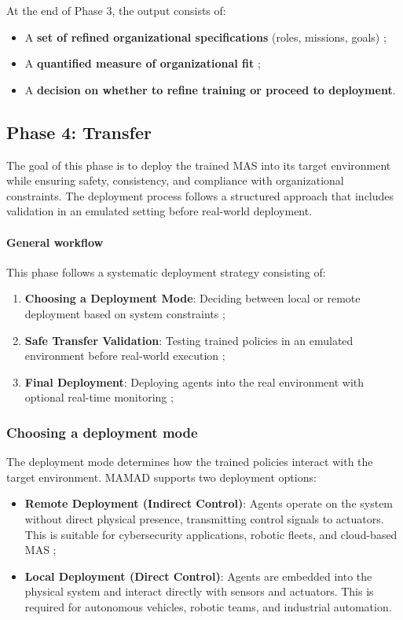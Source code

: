 \documentclass[pdflatex,sn-mathphys-num]{sn-jnl}%
\theoremstyle{thmstyleone}%
\theoremstyle{thmstyletwo}%
\theoremstyle{thmstylethree}%
\begin{document}
At the end of Phase 3, the output consists of:
\begin{itemize}
    \item A \textbf{set of refined organizational specifications} (roles, missions, goals) ;
    \item A \textbf{quantified measure of organizational fit} ;
    \item A \textbf{decision on whether to refine training or proceed to deployment}.
\end{itemize}



\subsection{Phase 4: Transfer}

The goal of this phase is to deploy the trained MAS into its target environment while ensuring safety, consistency, and compliance with organizational constraints. The deployment process follows a structured approach that includes validation in an emulated setting before real-world deployment.

\paragraph{\textbf{General workflow}}
This phase follows a systematic deployment strategy consisting of:
\begin{enumerate}
    \item \textbf{Choosing a Deployment Mode}: Deciding between local or remote deployment based on system constraints ;
    \item \textbf{Safe Transfer Validation}: Testing trained policies in an emulated environment before real-world execution ;
    \item \textbf{Final Deployment}: Deploying agents into the real environment with optional real-time monitoring ;
\end{enumerate}

\subsubsection{Choosing a deployment mode}
The deployment mode determines how the trained policies interact with the target environment. MAMAD supports two deployment options:

\begin{itemize}
    \item \textbf{Remote Deployment (Indirect Control)}: Agents operate on the system without direct physical presence, transmitting control signals to actuators. This is suitable for cybersecurity applications, robotic fleets, and cloud-based MAS ;
    \item \textbf{Local Deployment (Direct Control)}: Agents are embedded into the physical system and interact directly with sensors and actuators. This is required for autonomous vehicles, robotic teams, and industrial automation.
\end{itemize}
\end{document}
